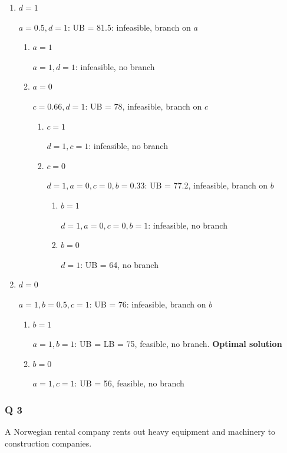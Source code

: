 \documentclass[10pt]{article}
\begin{document}
\begin{enumerate}
    \item $d = 1 $

    $a = 0.5, d = 1 $: UB = 81.5: infeasible, branch on $a $
    \begin{enumerate}
        \item $a = 1 $

        $a = 1, d = 1 $: infeasible, no branch 
        \item $a = 0 $

        $c = 0.66, d = 1 $: UB = 78, infeasible, branch on $c $
        \begin{enumerate}
            \item $c = 1 $

            $d = 1, c = 1 $: infeasible, no branch 
            \item $c = 0 $

            $d = 1, a = 0, c = 0, b = 0.33 $: UB = 77.2, infeasible, branch on $b $
            \begin{enumerate}
                \item $b = 1 $

                $d = 1, a = 0, c = 0, b = 1 $: infeasible, no branch 
                \item $b = 0 $

                $d = 1 $: UB = 64, no branch 
            \end{enumerate}
        \end{enumerate}
    \end{enumerate}
    \item $d = 0 $

    $a = 1, b = 0.5, c = 1 $: UB = 76: infeasible, branch on $b $
    \begin{enumerate}
        \item $b = 1 $

        $a = 1, b = 1 $: UB = LB = 75, feasible, no branch. \textbf{Optimal solution}
        \item $b = 0 $

        $a = 1, c = 1 $: UB = 56, feasible, no branch 
    \end{enumerate}
\end{enumerate}

\newpage
\subsubsection{Q 3}
A Norwegian rental company rents out heavy equipment and machinery to construction companies.
\end{document}
